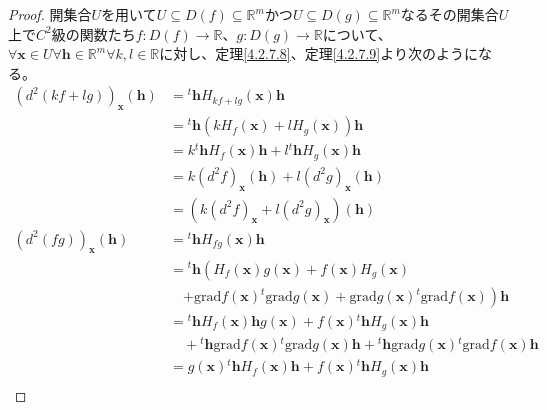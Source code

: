 \documentclass[dvipdfmx]{jsarticle}
\begin{document}
\begin{proof}
開集合$U$を用いて$U \subseteq D(f) \subseteq \mathbb{R}^{m}$かつ$U \subseteq D(g) \subseteq \mathbb{R}^{m}$なるその開集合$U$上で$C^{2}$級の関数たち$f:D(f) \rightarrow \mathbb{R}$、$g:D(g) \rightarrow \mathbb{R}$について、$\forall\mathbf{x} \in U\forall\mathbf{h} \in \mathbb{R}^{m}\forall k,l \in \mathbb{R}$に対し、定理\ref{4.2.7.8}、定理\ref{4.2.7.9}より次のようになる。
\begin{align*}
\left( d^{2}(kf + lg) \right)_{\mathbf{x}}\left( \mathbf{h} \right) &={}^{t}\mathbf{h}H_{kf + lg}\left( \mathbf{x} \right)\mathbf{h}\\
&={}^{t}\mathbf{h}\left( kH_{f}\left( \mathbf{x} \right) + lH_{g}\left( \mathbf{x} \right) \right)\mathbf{h}\\
&= k{}^{t}\mathbf{h}H_{f}\left( \mathbf{x} \right)\mathbf{h} + l{}^{t}\mathbf{h}H_{g}\left( \mathbf{x} \right)\mathbf{h}\\
&= k\left( d^{2}f \right)_{\mathbf{x}}\left( \mathbf{h} \right) + l\left( d^{2}g \right)_{\mathbf{x}}\left( \mathbf{h} \right)\\
&= \left( k\left( d^{2}f \right)_{\mathbf{x}} + l\left( d^{2}g \right)_{\mathbf{x}} \right)\left( \mathbf{h} \right)\\
\left( d^{2}(fg) \right)_{\mathbf{x}}\left( \mathbf{h} \right) &={}^{t}\mathbf{h}H_{fg}\left( \mathbf{x} \right)\mathbf{h}\\
&={}^{t}\mathbf{h}\left( H_{f}\left( \mathbf{x} \right)g\left( \mathbf{x} \right) + f\left( \mathbf{x} \right)H_{g}\left( \mathbf{x} \right) \right. \\
&\quad \left. + \mathrm{grad}f\left( \mathbf{x} \right){}^{t}\mathrm{grad}g\left( \mathbf{x} \right) + \mathrm{grad}g\left( \mathbf{x} \right){}^{t}\mathrm{grad}f\left( \mathbf{x} \right) \right)\mathbf{h}\\
&={}^{t}\mathbf{h}H_{f}\left( \mathbf{x} \right)\mathbf{h}g\left( \mathbf{x} \right) + f\left( \mathbf{x} \right){}^{t}\mathbf{h}H_{g}\left( \mathbf{x} \right)\mathbf{h} \\
&\quad +{}^{t}\mathbf{h}\mathrm{grad}f\left( \mathbf{x} \right){}^{t}\mathrm{grad}g\left( \mathbf{x} \right)\mathbf{h} +{}^{t}\mathbf{h}\mathrm{grad}g\left( \mathbf{x} \right){}^{t}\mathrm{grad}f\left( \mathbf{x} \right)\mathbf{h}\\
&= g\left( \mathbf{x} \right){}^{t}\mathbf{h}H_{f}\left( \mathbf{x} \right)\mathbf{h} + f\left( \mathbf{x} \right){}^{t}\mathbf{h}H_{g}\left( \mathbf{x} \right)\mathbf{h} \\

\end{align*}
\end{proof}
\end{document}
